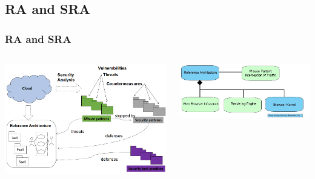 \documentclass[serif,9pt]{beamer}
\begin{document}
\subsection{RA and SRA}
\begin{frame}
	\frametitle{RA and SRA}
	\begin{columns}
		\begin{minipage}[c][0.4\textheight][c]{\linewidth}
		  \centering
		  \includegraphics[scale=0.26]{figures/SRA.png}
		  \label{fig:Malware}
		\end{minipage}
		\begin{minipage}[c][0.4\textheight][c]{\linewidth}
		  \centering
		  \includegraphics[scale=0.36]{figures/relations.jpg}
		  \label{fig:vulnExt}
		\end{minipage}
	\end{columns}
\end{frame}
\end{document}
